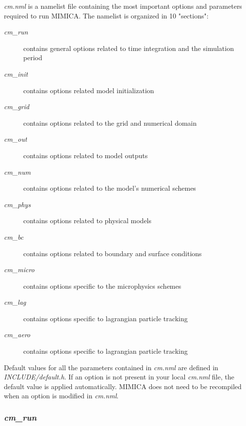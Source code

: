 \documentclass[12pt,A4,french]{article}
\begin{document}
{\it cm.nml} is a namelist file containing the most important options and parameters required to run MIMICA. The namelist is organized in 10 "sections": 
\begin{description}
\item[{\it cm\_run}] contains general options related to time integration and the simulation period
\item[{\it cm\_init}] contains options related model initialization
\item[{\it cm\_grid}] contains options related to the grid and numerical domain
\item[{\it cm\_out}] contains options related to model outputs
\item[{\it cm\_num}] contains options related to the model's numerical schemes
\item[{\it cm\_phys}] contains options related to physical models
\item[{\it cm\_bc}] contains options related to boundary and surface conditions
\item[{\it cm\_micro}] contains options specific to the microphysics schemes
\item[{\it cm\_lag}] contains options specific to lagrangian particle tracking
\item[{\it cm\_aero}] contains options specific to lagrangian particle tracking
\end{description}
Default values for all the parameters contained in {\it cm.nml} are defined in {\it INCLUDE/default.h}. If an option is not present in your local {\it cm.nml} file, the default value is applied automatically. MIMICA does not need to be recompiled when an option is modified in {\it cm.nml}. 

\subsubsection{{\it cm\_run}}
\end{document}
